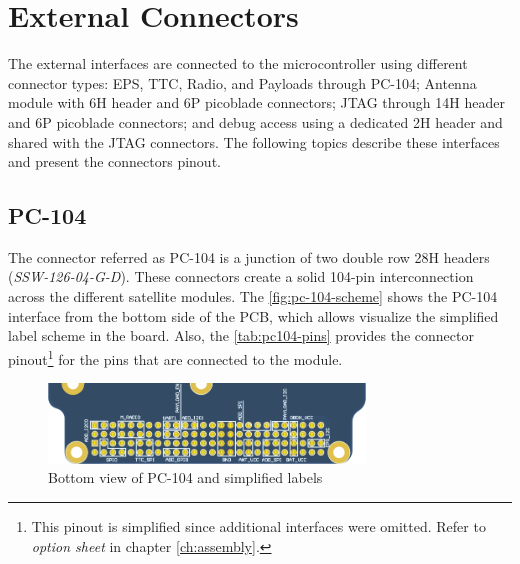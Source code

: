 
\section{External Connectors}

The external interfaces are connected to the microcontroller using different connector types: EPS, TTC, Radio, and Payloads through PC-104; Antenna module with 6H header and 6P picoblade connectors; JTAG through 14H header and 6P picoblade connectors; and debug access using a dedicated 2H header and shared with the JTAG connectors. The following topics describe these interfaces and present the connectors pinout.

\subsection{PC-104}

The connector referred as PC-104 is a junction of two double row 28H headers (\textit{SSW-126-04-G-D}). These connectors create a solid 104-pin interconnection across the different satellite modules. The \autoref{fig:pc-104-scheme} shows the PC-104 interface from the bottom side of the PCB, which allows visualize the simplified label scheme in the board. Also, the \autoref{tab:pc104-pins} provides the connector pinout\footnote{This pinout is simplified since additional interfaces were omitted. Refer to \textit{option sheet} in chapter \ref{ch:assembly}.} for the pins that are connected to the module. 

\begin{figure}[!ht]
    \begin{center}
        \includegraphics[width=0.75\textwidth]{figures/pc-104-scheme.png}
        \caption{Bottom view of PC-104 and simplified labels}
        \label{fig:pc-104-scheme}
    \end{center}
\end{figure}

